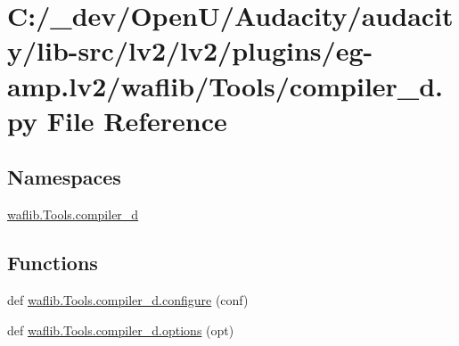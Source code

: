 \hypertarget{lv2_2plugins_2eg-amp_8lv2_2waflib_2_tools_2compiler__d_8py}{}\section{C\+:/\+\_\+dev/\+Open\+U/\+Audacity/audacity/lib-\/src/lv2/lv2/plugins/eg-\/amp.lv2/waflib/\+Tools/compiler\+\_\+d.py File Reference}
\label{lv2_2plugins_2eg-amp_8lv2_2waflib_2_tools_2compiler__d_8py}
\subsection*{Namespaces}
\begin{DoxyCompactItemize}
\item 
 \hyperlink{namespacewaflib_1_1_tools_1_1compiler__d}{waflib.\+Tools.\+compiler\+\_\+d}
\end{DoxyCompactItemize}
\subsection*{Functions}
\begin{DoxyCompactItemize}
\item 
def \hyperlink{namespacewaflib_1_1_tools_1_1compiler__d_a1bde6bb386d77bc326bb0a1b73688c4f}{waflib.\+Tools.\+compiler\+\_\+d.\+configure} (conf)
\item 
def \hyperlink{namespacewaflib_1_1_tools_1_1compiler__d_a4f8b0fc5058863cd242ac3d83ff8f022}{waflib.\+Tools.\+compiler\+\_\+d.\+options} (opt)
\end{DoxyCompactItemize}
